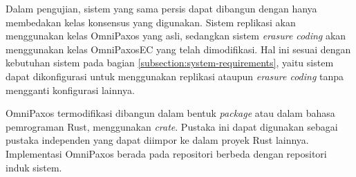 Dalam pengujian, sistem yang sama persis dapat dibangun dengan hanya membedakan kelas konsensus yang digunakan. Sistem replikasi akan menggunakan kelas OmniPaxos yang asli, sedangkan sistem \textit{erasure coding} akan menggunakan kelas OmniPaxosEC yang telah dimodifikasi. Hal ini sesuai dengan kebutuhan sistem pada bagian \ref{subsection:system-requirements}, yaitu sistem dapat dikonfigurasi untuk menggunakan replikasi ataupun \textit{erasure coding} tanpa mengganti konfigurasi lainnya.

OmniPaxos termodifikasi dibangun dalam bentuk \textit{package} atau dalam bahasa pemrograman Rust, menggunakan \textit{crate}. Pustaka ini dapat digunakan sebagai pustaka independen yang dapat diimpor ke dalam proyek Rust lainnya. Implementasi OmniPaxos berada pada repositori berbeda dengan repositori induk sistem.